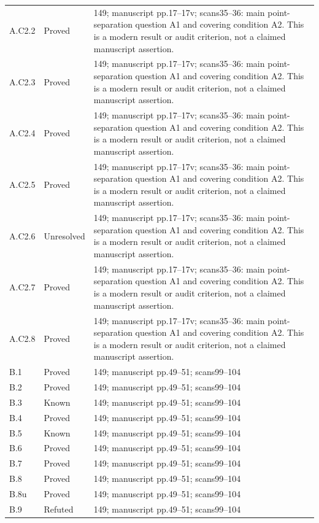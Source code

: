 {\begin{longtable}{p{1.9cm}p{1.7cm}p{10.3cm}}
A.C2.2 & Proved & 149; manuscript pp.17–17v; scans35–36: main point-separation question A1 and covering condition A2. This is a modern result or audit criterion, not a claimed manuscript assertion. \\
A.C2.3 & Proved & 149; manuscript pp.17–17v; scans35–36: main point-separation question A1 and covering condition A2. This is a modern result or audit criterion, not a claimed manuscript assertion. \\
A.C2.4 & Proved & 149; manuscript pp.17–17v; scans35–36: main point-separation question A1 and covering condition A2. This is a modern result or audit criterion, not a claimed manuscript assertion. \\
A.C2.5 & Proved & 149; manuscript pp.17–17v; scans35–36: main point-separation question A1 and covering condition A2. This is a modern result or audit criterion, not a claimed manuscript assertion. \\
A.C2.6 & Unresolved & 149; manuscript pp.17–17v; scans35–36: main point-separation question A1 and covering condition A2. This is a modern result or audit criterion, not a claimed manuscript assertion. \\
A.C2.7 & Proved & 149; manuscript pp.17–17v; scans35–36: main point-separation question A1 and covering condition A2. This is a modern result or audit criterion, not a claimed manuscript assertion. \\
A.C2.8 & Proved & 149; manuscript pp.17–17v; scans35–36: main point-separation question A1 and covering condition A2. This is a modern result or audit criterion, not a claimed manuscript assertion. \\
B.1 & Proved & 149; manuscript pp.49–51; scans99–104 \\
B.2 & Proved & 149; manuscript pp.49–51; scans99–104 \\
B.3 & Known & 149; manuscript pp.49–51; scans99–104 \\
B.4 & Proved & 149; manuscript pp.49–51; scans99–104 \\
B.5 & Known & 149; manuscript pp.49–51; scans99–104 \\
B.6 & Proved & 149; manuscript pp.49–51; scans99–104 \\
B.7 & Proved & 149; manuscript pp.49–51; scans99–104 \\
B.8 & Proved & 149; manuscript pp.49–51; scans99–104 \\
B.8u & Proved & 149; manuscript pp.49–51; scans99–104 \\
B.9 & Refuted & 149; manuscript pp.49–51; scans99–104 \\

\end{longtable}}
